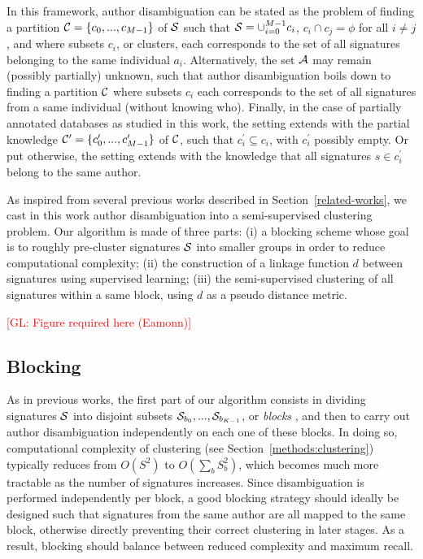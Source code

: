 \documentclass{article}
\newcommand{\glnote}[1]{\textcolor{red}{[GL: #1]}}
\begin{document}
In this
framework, author disambiguation can be stated as the problem of
finding a partition ${\cal C} = \{ c_0, ..., c_{M-1} \}$ of ${\cal S}$ such
that ${\cal S} = \cup_{i=0}^{M-1} c_i$, $c_i \cap c_j = \phi$ for all $i \neq
j$, and where subsets $c_i$, or clusters, each corresponds to the set of all
signatures belonging to the same individual $a_i$. Alternatively, the set
${\cal A}$ may remain (possibly partially) unknown, such that author
disambiguation boils down to finding a partition ${\cal C}$ where
subsets $c_i$  each corresponds to the set of all signatures from a same
individual (without knowing who). Finally, in the case of partially annotated databases as studied in
this work, the setting extends with the partial knowledge ${\cal C}^\prime = \{ c_0^\prime, ..., c_{M-1}^\prime \}$ of ${\cal C}$,
such that $c_i^\prime \subseteq c_i$, with $c_i^\prime$ possibly empty.
Or put otherwise, the setting extends with the knowledge that all signatures
$s \in c_i^\prime$ belong to the same author.

As inspired from several previous works described in Section~\ref{related-works},
we cast in this work author disambiguation into a semi-supervised clustering
problem.  Our algorithm is made of three parts: (i) a blocking
scheme whose goal is to roughly pre-cluster signatures ${\cal S}$ into smaller groups in order to
reduce computational complexity; (ii) the construction of a linkage function
$d$ between signatures using supervised learning; (iii) the
semi-supervised clustering of all signatures within a same block, using $d$ as a pseudo distance metric.

\glnote{Figure required here (Eamonn)}

\subsection{Blocking}
\label{methods:blocking}

As in previous works, the first part of our algorithm consists in dividing
signatures ${\cal S}$ into disjoint subsets ${\cal S}_{b_0}, ..., {\cal
S}_{b_{K-1}}$, or \textit{blocks} \citep{fellegi69}, and then to carry out
author disambiguation independently on each one of these blocks. In doing so,
computational complexity of clustering (see Section~\ref{methods:clustering})
typically reduces from $O(S^2)$ to $O(\sum_b S_b^2)$, which becomes much more
tractable as the number of signatures increases. Since disambiguation is
performed independently per block, a good blocking strategy should ideally be
designed such that signatures from the same author are all mapped to the same
block, otherwise directly preventing their correct clustering in later stages. As a
result, blocking should balance between reduced complexity and maximum recall.
\end{document}
